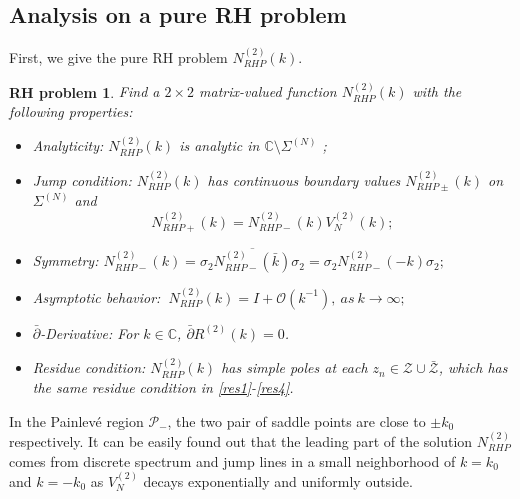 \documentclass[11pt]{article}
\numberwithin{equation}{section}
\newtheorem{RHP}{RH problem}
\begin{document}
\subsection{Analysis on a pure RH problem}\label{sec4.3}
First, we give the pure RH problem $N^{(2)}_{RHP}(k)$.
\begin{RHP}\label{rhp20}
      Find a $2\times 2$ matrix-valued function $N^{(2)}_{RHP}(k)$ with the following properties:
\begin{itemize}
  \item Analyticity: $N^{(2)}_{RHP}(k)$ is analytic in $\mathbb{C}\setminus \Sigma^{(N)}$ ;
  \item Jump condition: $N^{(2)}_{RHP}(k)$ has continuous boundary values $N^{(2)}_{RHP\pm}(k)$ on $\Sigma^{(N)}$ and
 \begin{equation}
N^{(2)}_{RHP+}(k)=N^{(2)}_{RHP-}(k)V^{(2)}_N(k);
\end{equation}
\item Symmetry:
$N^{(2)}_{RHP-}(k)=\sigma_2 \overline{ N^{(2)}_{RHP-}(\bar{k})}\sigma_2=\sigma_2 N^{(2)}_{RHP-}(-k)\sigma_2;$

  \item Asymptotic behavior:
  $\ N^{(2)}_{RHP}(k)=I+\mathcal{O}(k^{-1}),\ as \ k\to \infty;$
  \item $\bar{\partial}$-Derivative: For $k\in\mathbb{C}$, $\bar{\partial}R^{(2)}(k)=0$.
\item Residue condition: $N^{(2)}_{RHP}(k)$ has simple poles at each $z_n\in\mathcal{Z}\cup\bar{\mathcal{Z}}$, which  has the same residue condition in \eqref{res1}-\eqref{res4}.
\end{itemize}
\end{RHP}

In the Painlev\'e region $\mathcal{P}_-$, the two pair of saddle points are close to $\pm k_0$ respectively. It can be easily found out that the leading part of the solution $N^{(2)}_{RHP}$ comes from discrete spectrum and jump lines in a small neighborhood of $k=k_0$ and $k=-k_0$ as $V^{(2)}_N$ decays exponentially and uniformly outside.
\end{document}
